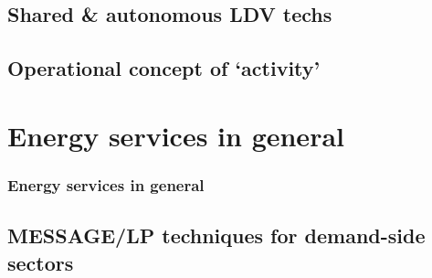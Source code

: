 \documentclass[12pt,aspectratio=169]{beamer}
\begin{document}
\subsection{Shared \& autonomous LDV techs}
\subsection{Operational concept of ‘activity’}



\section{Energy services in general}

\begin{frame}
  \frametitle{Energy services in general}

  \tableofcontents[currentsection]

\end{frame}

\subsection{MESSAGE/LP techniques for demand-side sectors}
\end{document}
